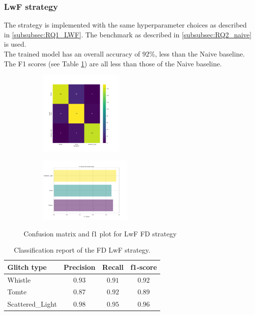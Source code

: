\subsubsection{LwF strategy}
\label{subsubsec:RQ2_lwf}
The strategy is implemented with the same hyperparameter choices as described in \ref{subsubsec:RQ1_LWF}. The benchmark as described in \ref{subsubsec:RQ2_naive} is used. \\
The trained model has an overall accuracy of $92\%$, less than the Naive baseline. The F1 scores (see Table \ref{tbl:RQ2_class_report_FD_LwF}) are all less than those of the Naive baseline. 

\begin{figure}[H]
\centering
\begin{subfigure}
  \centering
  \includegraphics[width=0.45\textwidth]{Images/cm_FD_model_LwF.png}  
  \label{fig:fd_sub-first}
\end{subfigure}
\begin{subfigure}
  \centering
  \includegraphics[width=0.50\textwidth]{Images/f1_FD_model_LwF.png}  
  \label{fig:fd_sub-second}
\end{subfigure}
\caption{Confusion matrix and f1 plot for LwF FD strategy}
\label{fig:cm_f1_FD_LwF}
\end{figure}

\begin{table}[ht]
\centering
    \begin{tabular}{|l|c c c|}
    \hline
    \textbf{Glitch type} & \textbf{Precision} & \textbf{Recall} & \textbf{f1-score} \\ \hline
    Whistle & $0.93$ & $0.91$ & $0.92$ \\
    Tomte & $0.87$ & $0.92$ & $0.89$ \\
    Scattered\_Light & $0.98$ & $0.95$ & $0.96$ \\
    \hline
    \end{tabular}
    \caption{Classification report of the FD LwF strategy.}
    \label{tbl:RQ2_class_report_FD_LwF}
\end{table}

